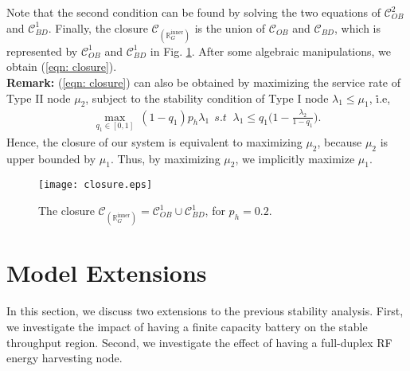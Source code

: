 \documentclass[draftcls,12pt,onecolumn]{IEEEtran}
\begin{document}
Note that the second condition can be found by solving the two equations of $\mathcal{C}_{\textit{OB}}^2$ and $\mathcal{C}_{\textit{BD}}^1$. Finally, the closure $\mathcal{C}_{(\mathbb{R}_G^{\text{inner}})}$ is the union of $\mathcal{C}_{\textit{OB}}$ and $\mathcal{C}_{\textit{BD}}$, which is represented by $\mathcal{C}_{\textit{OB}}^1$ and $\mathcal{C}_{\textit{BD}}^1$ in Fig. \ref{fig: closure}. After some algebraic manipulations, we obtain (\ref{eqn: closure}).\\
\indent \textbf{Remark:} (\ref{eqn: closure}) can also be obtained by maximizing the service rate of Type II node $\mu_2$, subject to the stability condition of Type I node $\lambda_1 \leq \mu_1$, \.i.e, 
\begin{align}
\max\limits_{q_1 \in [0,1]} \  (1-q_1) p_h \lambda_1  \ \ \textit{s.t } \ \lambda_1 \leq  q_1 \big( 1- \frac{\lambda_2}{1-q_1}\big).
\end{align}
Hence, the closure of our system is equivalent to maximizing $\mu_2$, because $\mu_2 $ is upper bounded by $\mu_1$. Thus, by maximizing $\mu_2$, we implicitly maximize $\mu_1$.  
\begin{figure}[t]
\texttt{[image: closure.eps]}
\centering
\caption{The closure $\mathcal{C}_{(\mathbb{R}_G^{\text{inner}})}= \mathcal{C}_{\textit{OB}}^1 \cup \mathcal{C}_{\textit{BD}}^1$, for $p_h=0.2$. }\label{fig: closure}
\end{figure}
\section{Model Extensions} \label{sec:Extensions}
In this section, we discuss two extensions to the previous stability analysis. First, we investigate the impact of having a finite capacity battery on the stable throughput region. Second, we investigate the effect of having a full-duplex RF energy harvesting node.
\end{document}
